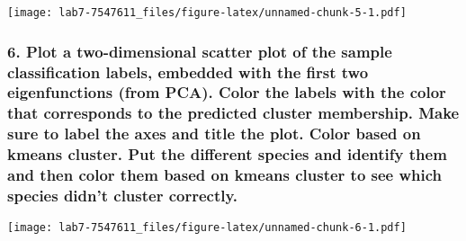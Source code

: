 \documentclass[]{article}
\newenvironment{Shaded}{\begin{snugshade}}{\end{snugshade}}
\newcommand{\KeywordTok}[1]{\textcolor[rgb]{0.13,0.29,0.53}{\textbf{{#1}}}}
\newcommand{\DataTypeTok}[1]{\textcolor[rgb]{0.13,0.29,0.53}{{#1}}}
\newcommand{\DecValTok}[1]{\textcolor[rgb]{0.00,0.00,0.81}{{#1}}}
\newcommand{\FloatTok}[1]{\textcolor[rgb]{0.00,0.00,0.81}{{#1}}}
\newcommand{\StringTok}[1]{\textcolor[rgb]{0.31,0.60,0.02}{{#1}}}
\newcommand{\NormalTok}[1]{{#1}}
\begin{document}
\begin{Shaded}
\end{Shaded}

\texttt{[image: lab7-7547611\_files/figure-latex/unnamed-chunk-5-1.pdf]}

\newpage

\subsubsection{6. Plot a two-dimensional scatter plot of the sample
classification labels, embedded with the first two eigenfunctions (from
PCA). Color the labels with the color that corresponds to the predicted
cluster membership. Make sure to label the axes and title the plot.
Color based on kmeans cluster. Put the different species and identify
them and then color them based on kmeans cluster to see which species
didn't cluster
correctly.}\label{plot-a-two-dimensional-scatter-plot-of-the-sample-classification-labels-embedded-with-the-first-two-eigenfunctions-from-pca.-color-the-labels-with-the-color-that-corresponds-to-the-predicted-cluster-membership.-make-sure-to-label-the-axes-and-title-the-plot.-color-based-on-kmeans-cluster.-put-the-different-species-and-identify-them-and-then-color-them-based-on-kmeans-cluster-to-see-which-species-didnt-cluster-correctly.}

\begin{Shaded}
\end{Shaded}

\texttt{[image: lab7-7547611\_files/figure-latex/unnamed-chunk-6-1.pdf]}
\end{document}
